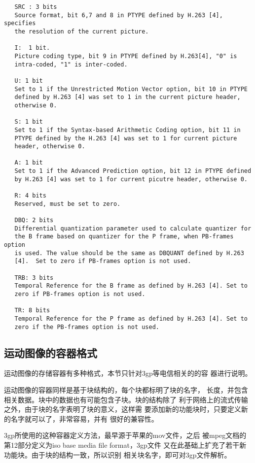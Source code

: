 \documentclass[11pt]{article}
\begin{document}
{\begin{verbatim}
   SRC : 3 bits
   Source format, bit 6,7 and 8 in PTYPE defined by H.263 [4], specifies
   the resolution of the current picture.

   I:  1 bit.
   Picture coding type, bit 9 in PTYPE defined by H.263[4], "0" is
   intra-coded, "1" is inter-coded.

   U: 1 bit
   Set to 1 if the Unrestricted Motion Vector option, bit 10 in PTYPE
   defined by H.263 [4] was set to 1 in the current picture header,
   otherwise 0.

   S: 1 bit
   Set to 1 if the Syntax-based Arithmetic Coding option, bit 11 in
   PTYPE defined by the H.263 [4] was set to 1 for current picture
   header, otherwise 0.

   A: 1 bit
   Set to 1 if the Advanced Prediction option, bit 12 in PTYPE defined
   by H.263 [4] was set to 1 for current picutre header, otherwise 0.

   R: 4 bits
   Reserved, must be set to zero.

   DBQ: 2 bits
   Differential quantization parameter used to calculate quantizer for
   the B frame based on quantizer for the P frame, when PB-frames option
   is used. The value should be the same as DBQUANT defined by H.263
   [4].  Set to zero if PB-frames option is not used.

   TRB: 3 bits
   Temporal Reference for the B frame as defined by H.263 [4]. Set to
   zero if PB-frames option is not used.

   TR: 8 bits
   Temporal Reference for the P frame as defined by H.263 [4]. Set to
   zero if the PB-frames option is not used.

\end{verbatim}
}

\subsection{运动图像的容器格式}
    运动图像的存储容器有多种格式，本节只针对3gp等电信相关的的容
器进行说明。
  
    运动图像的容器同样是基于块结构的，每个块都标明了块的名字，
长度，并包含相关数据。块中的数据也有可能包含子块。块的结构除了
利于网络上的流式传输之外，由于块的名字表明了块的意义，这样需
要添加新的功能块时，只要定义新的名字就可以了，非常容易，并有
很好的兼容性。

    3gp所使用的这种容器定义方法，最早源于苹果的mov文件，之后
被mpeg文档的第12部分定义为iso base media file format，3gp文件
又在此基础上扩充了若干新功能块。由于块的结构一致，所以识别
相关块名字，即可对3gp文件解析。
\end{document}
